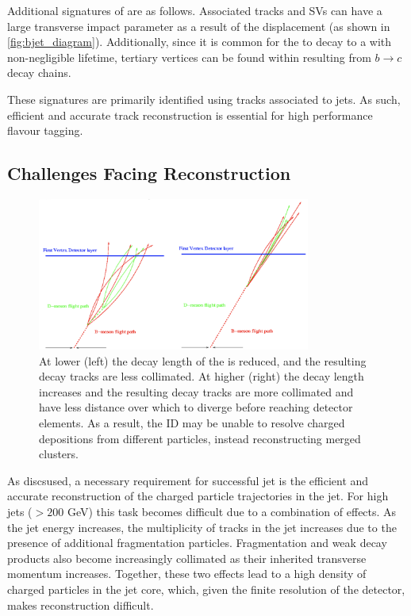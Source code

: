 Additional signatures of \bhadrons are as follows.
Associated tracks and SVs can have a large transverse impact parameter \dzero as a result of the \bhadron displacement (as shown in \cref{fig:bjet_diagram}).
Additionally, since it is common for the \bhadron to decay to a \chadron with non-negligible lifetime, tertiary vertices can be found within \bjets resulting from $b \rightarrow c$ decay chains.

These signatures are primarily identified using tracks associated to jets.
As such, efficient and accurate track reconstruction is essential for high performance flavour tagging.




\subsection{Challenges Facing \bhadron Reconstruction}\label{sec:b_track_reco_challenges}

\begin{figure}[!htbp]
  \centering
  \includegraphics[width=0.8\textwidth]{chapters/3.tracking/figs/high-pt-b-tracks.png}
  \caption{
    At lower \pt (left) the decay length of the \bhadron is reduced, and the resulting decay tracks are less collimated.
    At higher \pt (right) the \bhadron decay length increases and the resulting decay tracks are more collimated and have less distance over which to diverge before reaching detector elements.
    As a result, the ID may be unable to resolve charged depositions from different particles, instead reconstructing merged clusters.
  }
  \label{fig:high_pt_b_decay}
\end{figure}

As discsused, a necessary requirement for successful jet \btagging is the efficient and accurate reconstruction of the charged particle trajectories in the jet.
For high \pT jets (\pT $> 200$ GeV) this task becomes difficult due to a combination of effects.
As the jet energy increases, the multiplicity of tracks in the jet increases due to the presence of additional fragmentation particles.
Fragmentation and weak decay products also become increasingly collimated as their inherited transverse momentum increases.
Together, these two effects lead to a high density of charged particles in the jet core, which, given the finite resolution of the detector, makes reconstruction difficult.

